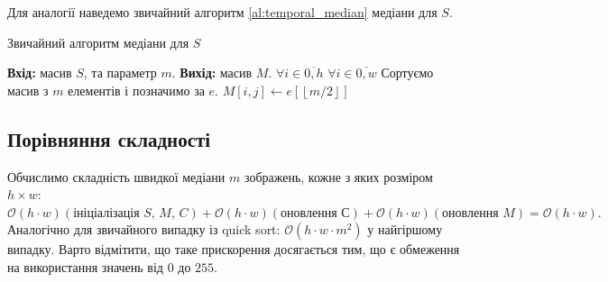 Для аналогії наведемо звичайний алгоритм \ref{al:temporal_median} медіани для $S$.
\begin{algorithm}[H]
    \caption{Звичайний алгоритм медіани для $S$}
    \label{al:temporal_median}
    \begin{algorithmic}
        \State \textbf{Вхід:} масив $S$, та параметр $m$.
        \State \textbf{Вихід:} масив $M$.
        \State  $\forall i \in \overline{0,h}$
        \State \qquad  $\forall i \in \overline{0,w}$
        \State \qquad \qquad  Сортуємо масив з $m$ елементів і позначимо за $e$.
        \State \qquad \qquad  $M[i,j] \gets e[\left\lfloor m/2 \right\rfloor ]$ 
    \end{algorithmic}
\end{algorithm}

\subsection{Порівняння складності}
Обчислимо складність швидкої медіани $m$ зображень, кожне з яких розміром $h \times w$:
$
    \mathcal{O}(h \cdot w) (\textit{ініціалізація S, M, C} )
    + \mathcal{O}(h \cdot w) (\textit{оновлення С})
    + \mathcal{O}(h \cdot w) (\textit{оновлення M}) = \mathcal{O}(h \cdot w).
$
Аналогічно для звичайного випадку із quick sort: $\mathcal{O}(h \cdot w \cdot m^2)$ у найгіршому випадку.
Варто відмітити, що таке прискорення досягається тим,
що є обмеження на використання значень від $0$ до $255$.

\clearpage
